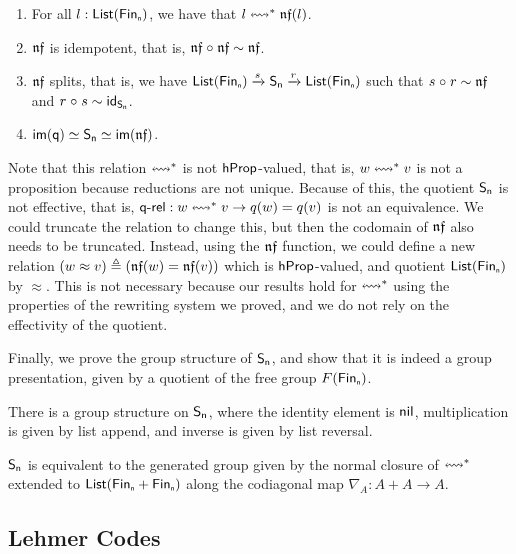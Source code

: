 \begin{proposition}
  \leavevmode
  \begin{enumerate}
    \item For all $l : \List[\Fin[n]]$, we have that $l \cox* \normf(l)$.
    \item $\operatorname{\mathsf{\mathfrak{nf}}}$ is idempotent, that is, $\operatorname{\mathsf{\mathfrak{nf}}} \mathrel{\circ} \operatorname{\mathsf{\mathfrak{nf}}} \mathrel{\sim} \operatorname{\mathsf{\mathfrak{nf}}}$.
    \item $\operatorname{\mathsf{\mathfrak{nf}}}$ splits, that is, we have ${\List[\Fin[n]]} \xrightarrow{s} \Sn[n] \xrightarrow{r} {\List[\Fin[n]]}$
          such that $s \mathrel{\circ} r \mathrel{\sim} \operatorname{\mathsf{\mathfrak{nf}}}$ and $r \comp s \htpy \idfunc_{\Sn[n]}$.
    \item \(\im{\quotinc} \eqv \Sn \eqv \im{\normf} \).
  \end{enumerate}
\end{proposition}

Note that this relation $\cox*$ is not $\mathsf{hProp}$-valued, that is, $w \cox* v$ is not a proposition because reductions are
not unique. Because of this, the quotient $\Sn$ is not effective, that is, $\quotrel : w \cox* v \to q(w) \id q(v)$ is
not an equivalence. We could truncate the relation to change this, but then the codomain of $\operatorname{\mathsf{\mathfrak{nf}}}$ also needs to be
truncated. Instead, using the $\operatorname{\mathsf{\mathfrak{nf}}}$ function, we could define a new relation
$(w \approx v) \defeq (\normf(w) \id \normf(v))$ which is $\mathsf{hProp}$-valued, and quotient $\List[\Fin[n]]$ by $\approx$.
This is not necessary because our results hold for $\cox*$ using the properties of the rewriting system we proved, and
we do not rely on the effectivity of the quotient.

Finally, we prove the group structure of $\Sn$, and show that it is indeed a group presentation, given by a quotient of
the free group $F(\Fin[n])$.

\begin{proposition}
  There is a group structure on $\Sn$, where the identity element is $\operatorname{\mathsf{nil}}$, multiplication is given by list append, and
  inverse is given by list reversal.
\end{proposition}

\begin{proposition}
  $\Sn$ is equivalent to the generated group given by the normal closure of $\cox*$ extended to
  $\List(\Fin[n] + \Fin[n])$ along the codiagonal map $\nabla_{A} : A + A \to A$.
\end{proposition}

\subsection{Lehmer Codes}~\label{subsec:lehmer}

